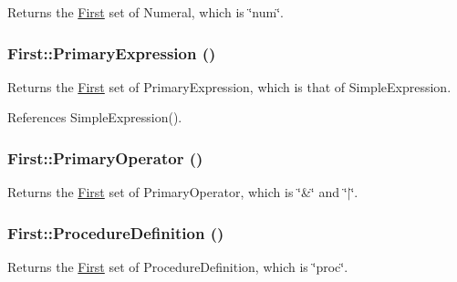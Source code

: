 Returns the \hyperlink{classFirst}{First} set of Numeral, which is \char`\"{}num\char`\"{}. 

\hypertarget{classFirst_ae25d77238175a4e13893ef54650c6276}{
\subsubsection[{PrimaryExpression}]{ First::PrimaryExpression ()}}
\label{classFirst_ae25d77238175a4e13893ef54650c6276}


Returns the \hyperlink{classFirst}{First} set of PrimaryExpression, which is that of SimpleExpression. 



References SimpleExpression().

\hypertarget{classFirst_a8fc3bc98fd57866b459cce1edd5c1925}{
\subsubsection[{PrimaryOperator}]{ First::PrimaryOperator ()}}
\label{classFirst_a8fc3bc98fd57866b459cce1edd5c1925}


Returns the \hyperlink{classFirst}{First} set of PrimaryOperator, which is \char`\"{}\&\char`\"{} and \char`\"{}$|$\char`\"{}. 

\hypertarget{classFirst_ab17ecbd0c5f0a850227885ba86f15835}{
\subsubsection[{ProcedureDefinition}]{ First::ProcedureDefinition ()}}
\label{classFirst_ab17ecbd0c5f0a850227885ba86f15835}


Returns the \hyperlink{classFirst}{First} set of ProcedureDefinition, which is \char`\"{}proc\char`\"{}. 

